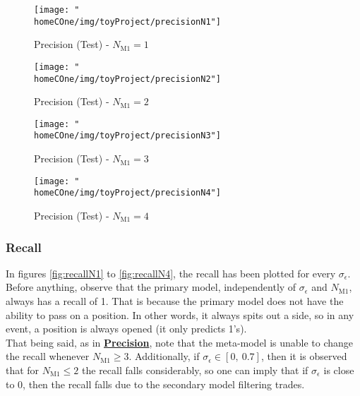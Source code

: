 \documentclass[a4paper]{report}
\newcommand{\homeCOne}{../../Chapter 1 - Metalabeling/Draft}
\begin{document}
\begin{figure}[htbp]
\centering
	\begin{minipage}{.5\textwidth}
	\centering
		\texttt{[image: "\\homeCOne/img/toyProject/precisionN1"]}
	  	\caption{Precision (Test) - $N_{\text{M1}} = 1$}
	  	\label{fig:precisionN1}
	\end{minipage}%
	\begin{minipage}{.5\textwidth}
	\centering
		\texttt{[image: "\\homeCOne/img/toyProject/precisionN2"]}
		\caption{Precision (Test) - $N_{\text{M1}} = 2$}
		\label{fig:precisionN2}
	\end{minipage}

	\vspace{.5cm}

	\begin{minipage}{.5\textwidth}
	\centering
		\texttt{[image: "\\homeCOne/img/toyProject/precisionN3"]}
		\caption{Precision (Test) - $N_{\text{M1}} = 3$}
		\label{fig:precisionN3}
	\end{minipage}%
	\begin{minipage}{.5\textwidth}
	\centering
		\texttt{[image: "\\homeCOne/img/toyProject/precisionN4"]}
		\caption{Precision (Test) - $N_{\text{M1}} = 4$}
		\label{fig:precisionN4}
	\end{minipage}
\end{figure}

\subsubsection{Recall}
\label{sec:toyProjectRecall}
In figures \ref{fig:recallN1} to \ref{fig:recallN4}, the recall has been 
plotted for every $\sigma_\epsilon$. Before anything, observe that the 
primary model, independently of $\sigma_\epsilon$ and $N_{\text{M1}}$, 
always has a recall of 1. That is because the primary model does not have 
the ability to pass on a position. In other words, it always spits out a 
side, so in any event, a position is always opened (it only predicts 1's).\\

That being said, as in 
\textbf{\hyperref[sec:toyProjectPrecision]{Precision}}, note that the 
meta-model is unable to change the recall whenever $N_{\text{M1}} \geq 3$. 
Additionally, if $\sigma_\epsilon \in [0,\ 0.7]$, then it is observed that 
for $N_{\text{M1}} \leq 2$ the recall falls considerably, so one can imply 
that if $\sigma_\epsilon$ is close to 0, then the recall falls due to the 
secondary model filtering trades.
\end{document}

